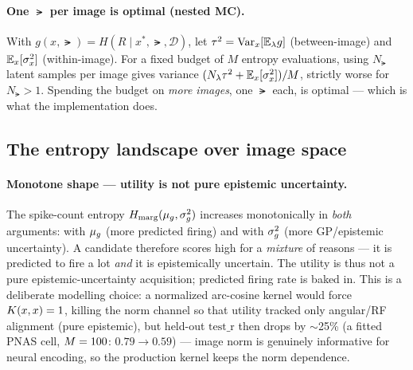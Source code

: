 \paragraph{One $\lat$ per image is optimal (nested MC).}
With $g(x,\lat)=H(R\mid x^{*},\lat,\mathcal D)$, let $\tau^{2}=\mathrm{Var}_x[\mathbb{E}_{\lambda}g]$
(between-image) and $\mathbb{E}_x[\sigma^{2}_x]$ (within-image). For a fixed budget of $M$
entropy evaluations, using $N_{\lat}$ latent samples per image gives variance
$(N_{\lambda}\tau^{2}+\mathbb{E}_x[\sigma^{2}_x])/M$, strictly worse for $N_{\lat}>1$.
Spending the budget on \emph{more images}, one $\lat$ each, is optimal --- which is
what the implementation does.


\subsection{The entropy landscape over image space}
\label{subsec:landscape}

\paragraph{Monotone shape --- utility is not pure epistemic uncertainty.}
The spike-count entropy $H_{\mathrm{marg}}(\mu_{g},\sigma_{g}^{2})$ increases monotonically in
\emph{both} arguments: with $\mu_{g}$ (more predicted firing) and with $\sigma_{g}^{2}$ (more
GP/epistemic uncertainty). A candidate therefore scores high for a \emph{mixture}
of reasons --- it is predicted to fire a lot \emph{and} it is epistemically
uncertain. The utility is thus not a pure epistemic-uncertainty acquisition;
predicted firing rate is baked in. This is a deliberate modelling choice: a
normalized arc-cosine kernel would force $K(x,x)=1$, killing the norm channel so
that utility tracked only angular/RF alignment (pure epistemic), but held-out
$\text{test\_r}$ then drops by $\sim$25\% (a fitted PNAS cell, $M=100$: $0.79\!\to\!0.59$)
--- image norm is genuinely informative for neural encoding, so the production
kernel keeps the norm dependence.

